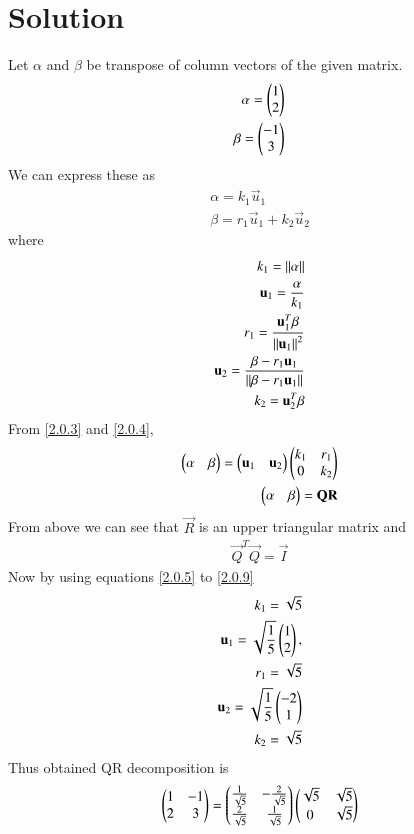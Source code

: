 \documentclass[journal,12pt,twocolumn]{IEEEtran}
\begin{document}
  \section{\textbf{Solution}}
  Let $\alpha$ and $\beta$ be transpose of column vectors of the given matrix.
  \begin{align}
\alpha=\begin{pmatrix}1\\2\end{pmatrix}\\
\beta=\begin{pmatrix}-1\\3\end{pmatrix}
\end{align}
We can express these as
\begin{align}
\alpha=k_1\vec{u}_1\label{2.0.3}\\
\beta=r_1\vec{u}_1+k_2\vec{u}_2\label{2.0.4}
\end{align}
where 
\begin{align}
k_1 = \left\lVert\alpha\right\rVert\label{2.0.5}\\\mathbf{u}_1 = \frac{\mathbf{\alpha}}{k_1} 
\\
r_1 = \frac{\mathbf{u}_1^T\beta}{\left\lVert\mathbf{u}_1\right\rVert^2}\\
\mathbf{u}_2 = \frac{\beta - r_1 \mathbf{u}_1}{\left\lVert\beta - r_1 \mathbf{u}_1\right\rVert}
\\
k_2 = {\mathbf{u}_2^T\beta}\label{2.0.9}
\end{align}
From \eqref{2.0.3} and \eqref{2.0.4}, 
\begin{align}
\begin{pmatrix}\alpha & \beta \end{pmatrix} = \begin{pmatrix}\mathbf{u}_1 & \mathbf{u}_2\end{pmatrix}\begin{pmatrix}k_1 & r_1 \\ 0 & k_2\end{pmatrix} \\
\begin{pmatrix}\alpha & \beta \end{pmatrix} = \mathbf{Q}\mathbf{R}
\end{align}
From above we can see that $\vec{R}$ is an upper triangular matrix and
\begin{align}
\vec{Q}^T\vec{Q}=\vec{I}
\end{align}
Now by using equations \eqref{2.0.5} to \eqref{2.0.9} 
\begin{align}
k_1 = \sqrt{5}\\ \mathbf{u}_1 = \sqrt{\frac{1}{5}} \begin{pmatrix}1\\2\end{pmatrix},
\\
r_1 = \sqrt{5}\\ \mathbf{u}_2 = \sqrt{\frac{1}{5}}\begin{pmatrix}-2\\1\end{pmatrix}
\\
k_2 = \sqrt{5}
\end{align}
Thus obtained QR decomposition is
\begin{align}
\begin{pmatrix}1&-1\\2&3\end{pmatrix}=\begin{pmatrix}\frac{1}{\sqrt{5}}& -\frac{2}{\sqrt{5}}\\\frac{2}{\sqrt{5}}& \frac{1}{\sqrt{5}}\end{pmatrix}\begin{pmatrix}\sqrt{5}&\sqrt{5}\\0&\sqrt{5}\end{pmatrix}
\end{align}
 
\end{document}

